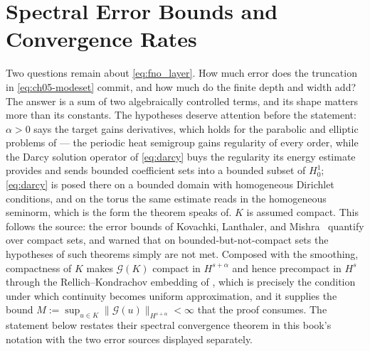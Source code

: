 \section{Spectral Error Bounds and Convergence Rates}
\label{sec:ch05-rates}

Two questions remain about \eqref{eq:fno_layer}. How much error does the
truncation in \eqref{eq:ch05-modeset} commit, and how much do the finite depth
and width add? The answer is a sum of two algebraically controlled terms, and
its shape matters more than its constants. The hypotheses deserve attention
before the statement: $\alpha > 0$ says the target gains derivatives, which
holds for the parabolic and elliptic problems of
 --- the periodic
heat semigroup gains regularity of every order, while the Darcy solution
operator of
\eqref{eq:darcy} buys the regularity its energy estimate provides and sends
bounded coefficient sets into a bounded subset of $H^1_0$; \eqref{eq:darcy} is
posed there on a bounded domain with homogeneous Dirichlet conditions, and on
the torus the same estimate reads in the homogeneous seminorm, which is the
form the theorem speaks of. $K$ is assumed
compact. This follows the source: the error bounds of Kovachki, Lanthaler, and
Mishra~\cite{kovachki2021universal} quantify over compact sets, and
 warned that on
bounded-but-not-compact sets the hypotheses of such theorems simply are not met.
Composed with the smoothing, compactness of $K$ makes $\mathcal{G}(K)$ compact
in $H^{s+\alpha}$ and hence precompact in $H^s$ through the Rellich--Kondrachov
embedding of
, which is
precisely the condition under which continuity becomes uniform approximation,
and it supplies the bound $M := \sup_{u \in K} \|\mathcal{G}(u)\|_{H^{s+\alpha}}
< \infty$ that the proof consumes.
The statement below restates their spectral convergence theorem in this book's
notation with the two error sources displayed separately.

